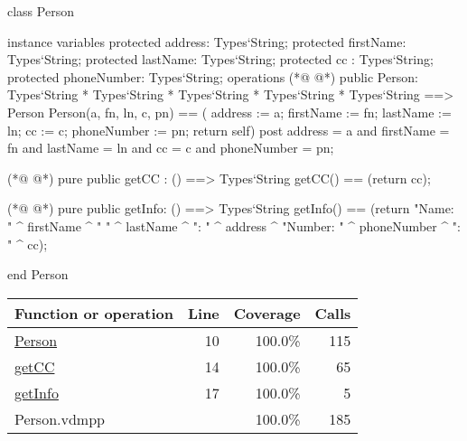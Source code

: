 \begin{vdmpp}[breaklines=true]
class Person

instance variables
  protected address: Types`String;
  protected firstName: Types`String;
  protected lastName: Types`String;
  protected cc : Types`String;
  protected phoneNumber: Types`String;
operations
(*@
\label{Person:10}
@*)
 public Person: Types`String * Types`String * Types`String * Types`String * Types`String ==> Person
  Person(a, fn, ln, c, pn) == ( address := a; firstName := fn; lastName := ln; cc := c; phoneNumber := pn; return self)
 post address = a and firstName = fn and lastName = ln and cc = c and phoneNumber = pn;
  
(*@
\label{getCC:14}
@*)
 pure public getCC : () ==> Types`String
  getCC() == (return cc);
  
(*@
\label{getInfo:17}
@*)
 pure public getInfo: () ==> Types`String
  getInfo() == (return "Name: " ^ firstName ^ " " ^ lastName ^ "\nAddress: " ^ address ^ "\nPhone Number: " ^ phoneNumber ^ "\nCC: " ^ cc);

end Person
\end{vdmpp}
\bigskip
\begin{longtable}{|l|r|r|r|}
\hline
Function or operation & Line & Coverage & Calls \\
\hline
\hline
\hyperref[Person:10]{Person} & 10&100.0\% & 115 \\
\hline
\hyperref[getCC:14]{getCC} & 14&100.0\% & 65 \\
\hline
\hyperref[getInfo:17]{getInfo} & 17&100.0\% & 5 \\
\hline
\hline
Person.vdmpp & & 100.0\% & 185 \\
\hline
\end{longtable}


